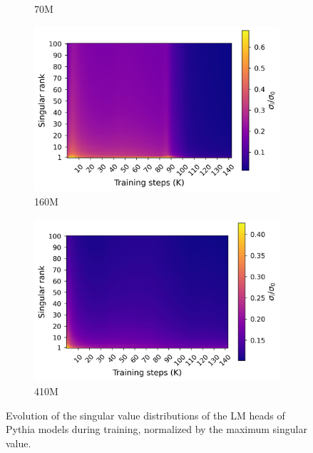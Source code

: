 \begin{figure}[ht!]
\begin{subfigure}{0.45\columnwidth}
         \caption{70M}
         \label{fig:sv_70M}
    \end{subfigure}
    \begin{subfigure}{0.45\columnwidth}
         \includegraphics[width=\linewidth]{sources/part_1/softmax_bottleneck/imgs/sv_map_160m.png}
         \caption{160M}
         \label{fig:sv_160M}
    \end{subfigure}
    \begin{subfigure}{0.45\columnwidth}
         \includegraphics[width=\linewidth]{sources/part_1/softmax_bottleneck/imgs/sv_map_410m.png}
         \caption{410M}
         \label{fig:sv_410M}
    \end{subfigure}
    \caption{Evolution of the singular value distributions of the LM heads of Pythia models during training, normalized by the maximum singular value.}
    \label{fig:sv_evolve}
\end{figure}

